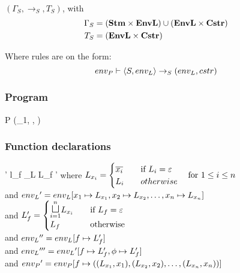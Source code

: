 \paragraph{}\noindent
$(\Gamma_S, \rightarrow_S, T_S)$, with
\begin{align*}
  \Gamma_S & = (\mathbf{Stm} \times \mathbf{EnvL}) \cup (\mathbf{EnvL} \times \mathbf{Cstr}) \\
  T_S & = (\mathbf{EnvL} \times \mathbf{Cstr})
\end{align*}

\noindent
Where rules are on the form:
\[ {env_P} \vdash \langle S, {env_L} \rangle \rightarrow_{S} ({env_L}, {cstr}) \]



\subsubsection{Program}

        {}
        { \quad
          }
        {}
\begin{trules}
        { {P} {(\ienvL_1, \icstr, \ienvP)} }
        {\ienvP \vdash {}}
        {}
\end{trules}

\subsubsection{Function declarations}

        {}
        {
          {\ienvL' \vdash l_f \rightarrow_L L_f \quad \ienvP' \vdash {}}}
        {where $L_{x_i} = \begin{cases}
          \overline{x_i} & \quad \text{if } L_i = \varepsilon \\
          L_i & \quad otherwise
        \end{cases}\quad \text{for } 1 \leq i \leq n$ \\
          and ${env_L}' = {env_L}[x_1 \mapsto L_{x_1}, x_2 \mapsto L_{x_2}, \dots, x_n \mapsto L_{x_n}]$ \\
          and $L_f' = \begin{cases}
            \mathlarger\sqcupl_{i = 1}^n L_{x_i} & \quad \text{if } L_f = \varepsilon \\
            L_f & \quad \text{otherwise}
        \end{cases}$ \\
          and ${env_L}'' = {env_L}[f \mapsto L_f']$ \\
          and ${env_L}''' = {env_L}'[f \mapsto L_f', \phi \mapsto L_f']$\\
          and ${env_P}' = {env_P}[f \mapsto ((L_{x_1}, x_1), (L_{x_2}, x_2), \dots, (L_{x_n}, x_n))]$}

